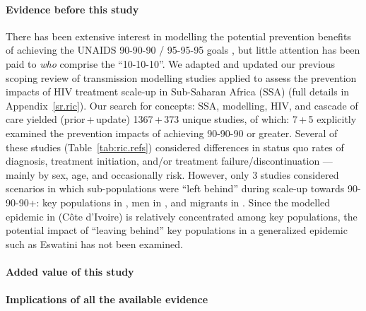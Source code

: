 \newcommand{\pu}[2]{#1\,+\,#2}
\begin{ric}
  \paragraph{Evidence before this study}
  There has been extensive interest in modelling the potential prevention benefits of
  achieving the UNAIDS 90-90-90 / 95-95-95 goals \cite{909090,959595},
  but little attention has been paid to \emph{who} comprise the ``10-10-10''.
  We adapted and updated our previous scoping review of transmission modelling studies
  applied to assess the prevention impacts of HIV treatment scale-up in Sub-Saharan Africa (SSA)
  \cite{Knight2022sr} (full details in Appendix~\ref{sr.ric}).
  Our search for concepts: SSA, modelling, HIV, and cascade of care
  yielded (\pu{prior}{update}) \pu{1367}{373} unique studies, of which:
  \pu{7}{5} explicitly examined the prevention impacts of achieving 90-90-90 or greater.
  Several of these studies (Table~\ref{tab:ric.refs}) considered differences in
  status quo rates of diagnosis, treatment initiation, and/or treatment failure/discontinuation
  --- mainly by sex, age, and occasionally risk.
  However, only 3 studies considered scenarios in which
  sub-populations were ``left behind'' during scale-up towards 90-90-90+:
  key populations in \cite{Maheu-Giroux2017art},
  men in \cite{Reidy2019}, and
  migrants in \cite{Marukutira2020}.
  Since the modelled epidemic in \cite{Maheu-Giroux2017art} (C\^{o}te d'Ivoire)
  is relatively concentrated among key populations,
  the potential impact of ``leaving behind'' key populations
  in a generalized epidemic such as Eswatini has not been examined.
  \paragraph{Added value of this study}
  \paragraph{Implications of all the available evidence}
\end{ric}
